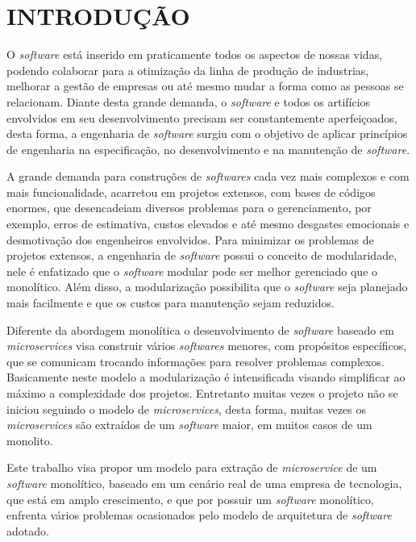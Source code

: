 \setcounter{page}{1}
\chapter{INTRODU\c{C}\~AO}  %
\label{chap:01}

O \textit{software} está inserido em praticamente todos os aspectos de nossas vidas, podendo colaborar para a otimização da linha de produção de industrias, melhorar a gestão de empresas ou até mesmo mudar a forma como as pessoas se relacionam. Diante desta grande demanda, o \textit{software} e todos os artifícios envolvidos em seu desenvolvimento precisam ser constantemente aperfeiçoados, desta forma, a engenharia de \textit{software} surgiu com o objetivo de aplicar princípios de engenharia na especificação, no desenvolvimento e na manutenção de \textit{software}.

A grande demanda para construções de \textit{softwares} cada vez mais complexos e com mais funcionalidade, acarretou em projetos extensos, com bases de códigos enormes, que desencadeiam diversos problemas para o gerenciamento, por exemplo, erros de estimativa, custos elevados e até mesmo desgastes emocionais e desmotivação dos engenheiros envolvidos. Para minimizar os problemas de projetos extensos, a engenharia de \textit{software} possui o conceito de modularidade, nele é enfatizado que o \textit{software} modular pode ser melhor gerenciado que o monolítico. Além disso, a modularização possibilita que o \textit{software} seja planejado mais facilmente e que os custos para manutenção sejam reduzidos.

Diferente da abordagem monolítica o desenvolvimento de \textit{software} baseado em \textit{microservices} visa construir vários \textit{softwares} menores, com propósitos específicos, que se comunicam trocando informações para resolver problemas complexos. Basicamente neste modelo a modularização é intensificada visando simplificar ao máximo a complexidade dos projetos. Entretanto muitas vezes o projeto não se iniciou seguindo o modelo de \textit{microservices}, desta forma, muitas vezes os \textit{microservices} são extraídos de um \textit{software} maior, em muitos casos de um monolito.

Este trabalho visa propor um modelo para extração de \textit{microservice} de um \textit{software} monolítico, baseado em um cenário real de uma empresa de tecnologia, que está em amplo crescimento, e que por possuir um \textit{software} monolítico, enfrenta vários problemas ocasionados pelo modelo de arquitetura de \textit{software} adotado.

